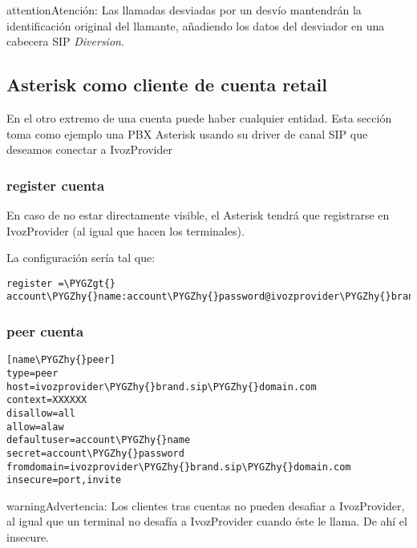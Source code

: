 \documentclass[letterpaper,10pt,spanish]{sphinxmanual}
\def\PYGZgt{\char`\>}
\def\PYGZhy{\char`\-}
\begin{document}
\begin{notice}{attention}{Atención:}
Las llamadas desviadas por un desvío mantendrán la identificación original del llamante, añadiendo los datos del desviador en una cabecera SIP \emph{Diversion}.
\end{notice}


\subsection{Asterisk como cliente de cuenta retail}
\label{retail/retail_accounts:asterisk-as-an-account-client}
En el otro extremo de una cuenta puede haber cualquier entidad. Esta sección toma como ejemplo una PBX Asterisk usando su driver de canal SIP que deseamos conectar a IvozProvider


\subsubsection{register cuenta}
\label{retail/retail_accounts:account-register}
En caso de no estar directamente visible, el Asterisk tendrá que registrarse en IvozProvider (al igual que hacen los terminales).

La configuración sería tal que:

\begin{Verbatim}[commandchars=\\\{\}]
register =\PYGZgt{} account\PYGZhy{}name:account\PYGZhy{}password@ivozprovider\PYGZhy{}brand.sip\PYGZhy{}domain.com
\end{Verbatim}


\subsubsection{peer cuenta}
\label{retail/retail_accounts:account-peer}
\begin{Verbatim}[commandchars=\\\{\}]
[name\PYGZhy{}peer]
type=peer
host=ivozprovider\PYGZhy{}brand.sip\PYGZhy{}domain.com
context=XXXXXX
disallow=all
allow=alaw
defaultuser=account\PYGZhy{}name
secret=account\PYGZhy{}password
fromdomain=ivozprovider\PYGZhy{}brand.sip\PYGZhy{}domain.com
insecure=port,invite
\end{Verbatim}

\begin{notice}{warning}{Advertencia:}
Los clientes tras cuentas no pueden desafiar a IvozProvider, al igual que un terminal no desafía a IvozProvider cuando éste le llama. De ahí el insecure.
\end{notice}
\end{document}
